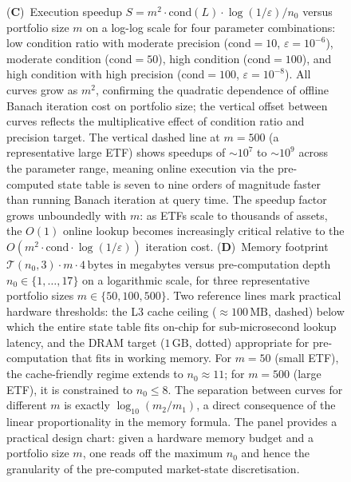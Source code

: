 \begin{figure}[!htbp]
{    (\textbf{C})~Execution speedup $S = m^2 \cdot \mathrm{cond}(L) \cdot \log(1/\varepsilon) / n_0$ versus portfolio size $m$ on a log-log scale for four parameter combinations: low condition ratio with moderate precision ($\mathrm{cond} = 10$, $\varepsilon = 10^{-6}$), moderate condition ($\mathrm{cond} = 50$), high condition ($\mathrm{cond} = 100$), and high condition with high precision ($\mathrm{cond} = 100$, $\varepsilon = 10^{-8}$).  All curves grow as $m^2$, confirming the quadratic dependence of offline Banach iteration cost on portfolio size; the vertical offset between curves reflects the multiplicative effect of condition ratio and precision target.  The vertical dashed line at $m = 500$ (a representative large ETF) shows speedups of $\sim 10^7$ to $\sim 10^9$ across the parameter range, meaning online execution via the pre-computed state table is seven to nine orders of magnitude faster than running Banach iteration at query time.  The speedup factor grows unboundedly with $m$: as ETFs scale to thousands of assets, the $O(1)$ online lookup becomes increasingly critical relative to the $O(m^2 \cdot \mathrm{cond} \cdot \log(1/\varepsilon))$ iteration cost.
    (\textbf{D})~Memory footprint $\mathcal{T}(n_0,3) \cdot m \cdot 4\,\mathrm{bytes}$ in megabytes versus pre-computation depth $n_0 \in \{1, \ldots, 17\}$ on a logarithmic scale, for three representative portfolio sizes $m \in \{50, 100, 500\}$.  Two reference lines mark practical hardware thresholds: the L3 cache ceiling ($\approx 100\,\mathrm{MB}$, dashed) below which the entire state table fits on-chip for sub-microsecond lookup latency, and the DRAM target ($1\,\mathrm{GB}$, dotted) appropriate for pre-computation that fits in working memory.  For $m = 50$ (small ETF), the cache-friendly regime extends to $n_0 \approx 11$; for $m = 500$ (large ETF), it is constrained to $n_0 \leq 8$.  The separation between curves for different $m$ is exactly $\log_{10}(m_2/m_1)$, a direct consequence of the linear proportionality in the memory formula.  The panel provides a practical design chart: given a hardware memory budget and a portfolio size $m$, one reads off the maximum $n_0$ and hence the granularity of the pre-computed market-state discretisation.}
    \label{fig:etf_panel_5}
\end{figure}
